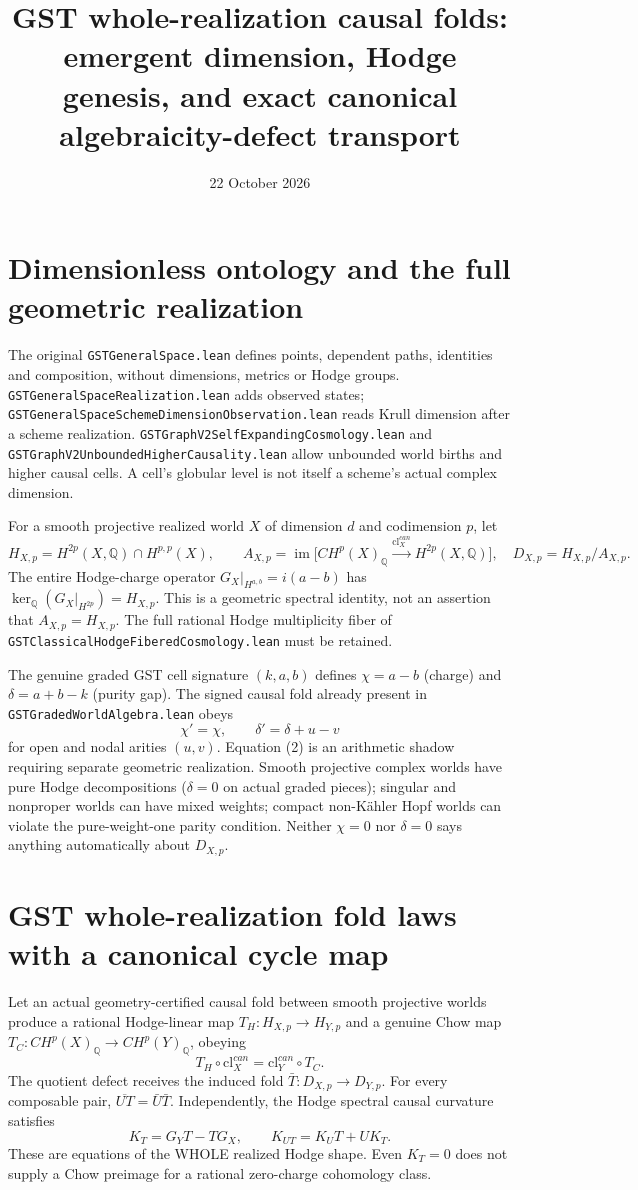 \documentclass[11pt]{article}
\title{GST whole-realization causal folds: emergent dimension, Hodge genesis, and exact canonical algebraicity-defect transport}
\date{22 October 2026}
\begin{document}
\maketitle
\section{Dimensionless ontology and the full geometric realization}
The original \texttt{GSTGeneralSpace.lean} defines points, dependent paths,
identities and composition, without dimensions, metrics or Hodge groups.
\texttt{GSTGeneralSpaceRealization.lean} adds observed states;
\texttt{GSTGeneralSpaceSchemeDimensionObservation.lean} reads Krull
dimension after a scheme realization.
\texttt{GSTGraphV2SelfExpandingCosmology.lean} and
\texttt{GSTGraphV2UnboundedHigherCausality.lean} allow unbounded world
births and higher causal cells. A cell's globular level is not itself
a scheme's actual complex dimension.

For a smooth projective realized world $X$ of dimension $d$ and
codimension $p$, let
\[
 H_{X,p}=H^{2p}(X,\mathbb Q)\cap H^{p,p}(X),\qquad
 A_{X,p}=\operatorname{im}\bigl[
 CH^p(X)_{\mathbb Q}\xrightarrow{\mathrm{cl}^{can}_X}
 H^{2p}(X,\mathbb Q)\bigr],
 \quad D_{X,p}=H_{X,p}/A_{X,p}.                 \tag{1}
\]
The entire Hodge-charge operator $G_X|_{H^{a,b}}=i(a-b)$ has
$\ker_{\mathbb Q}(G_X|_{H^{2p}})=H_{X,p}$.
This is a geometric spectral identity, not an assertion that
$A_{X,p}=H_{X,p}$.
The full rational Hodge multiplicity fiber of
\texttt{GSTClassicalHodgeFiberedCosmology.lean} must be retained.

The genuine graded GST cell signature $(k,a,b)$ defines
$\chi=a-b$ (charge) and $\delta=a+b-k$ (purity gap).
The signed causal fold already present in
\texttt{GSTGradedWorldAlgebra.lean} obeys
\[
 \chi'= \chi,\qquad \delta'=\delta+u-v              \tag{2}
\]
for open and nodal arities $(u,v)$.
Equation (2) is an arithmetic shadow requiring separate
geometric realization. Smooth projective complex worlds have
pure Hodge decompositions ($\delta=0$ on actual graded pieces);
singular and nonproper worlds can have mixed weights; compact
non-K\"ahler Hopf worlds can violate the pure-weight-one
parity condition. Neither $\chi=0$ nor $\delta=0$ says
anything automatically about $D_{X,p}$.

\section{GST whole-realization fold laws with a canonical cycle map}
Let an actual geometry-certified causal fold between smooth projective
worlds produce a rational Hodge-linear map $T_H:H_{X,p}\to H_{Y,p}$
and a genuine Chow map $T_C:CH^p(X)_{\mathbb Q}\to CH^p(Y)_{\mathbb Q}$,
obeying
\[
 T_H\circ\mathrm{cl}^{can}_X
   =\mathrm{cl}^{can}_Y\circ T_C.                   \tag{3}
\]
The quotient defect receives the induced fold
$\bar T:D_{X,p}\to D_{Y,p}$. For every composable pair,
$\overline{UT}=\bar U\bar T$. Independently, the
Hodge spectral causal curvature satisfies
\[
 K_T=G_YT-TG_X,\qquad K_{UT}=K_UT+UK_T.             \tag{4}
\]
These are equations of the WHOLE realized Hodge shape.
Even $K_T=0$ does not supply a Chow preimage for a rational
zero-charge cohomology class.
\end{document}
